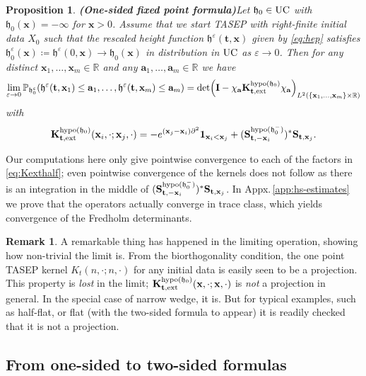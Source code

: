 \documentclass[letterpaper,reqno,11pt,oneside,final]{amsart}
\newtheorem{prop}[thm]{Proposition}
\theoremstyle{definition}
\newtheorem{rem}[thm]{Remark}
\newcommand{\fh}{\mathfrak{h}}
\newcommand{\pp}{\mathbb{P}}
\newcommand{\rr}{\mathbb{R}}
\newcommand{\uno}[1]{\mathbf{1}_{#1}}
\newcommand{\ep}{\varepsilon}
\newcommand{\uptext}[1]{\text{\upshape{#1}}}
\DeclareMathOperator{\hypo}{\uptext{hypo}}
\DeclareMathOperator{\UC}{\uptext{UC}}
\newcommand{\fT}{\mathbf{S}}
\newcommand{\ft}{\mathbf{t}}
\newcommand{\fx}{\mathbf{x}}
\newcommand{\fa}{\mathbf{a}}
\newcommand{\fK}{\mathbf{K}}
\newcommand{\fI}{\mathbf{I}}
\numberwithin{equation}{section}
\begin{document}
\begin{prop}{\bf (One-sided fixed point formula)}\label{prop:Kfixedpthalf}
\enspace Let $\fh_0\in \UC$ with  $\fh_0(\fx) = -\infty$ for $\fx>0$.
Assume that we start TASEP with right-finite initial data $X_0$ such that the rescaled height function $\fh^\ep(\ft,\fx)$ given by \eqref{eq:hep} satisfies $\fh^\ep_0(\fx)\coloneqq\fh^\ep(0,\fx)\longrightarrow\fh_0(\fx)$ in distribution in $\UC$ as $\ep\to0$. 
Then for any distinct $\fx_1,\dotsc,\fx_m\in\rr$ and any $\fa_1,\dotsc,\fa_m\in\rr$ we have
\begin{equation}
\lim_{\ep\to0}\pp_{\fh^\ep_0}\!\left(\fh^\ep(\ft,\fx_1)\leq \fa_1,\dotsc,\fh^\ep(\ft,\fx_m)\leq \fa_m\right)
=\det\!\left(\fI-\chi_{\fa} \fK^{\hypo(\fh_0)}_{\ft,\uptext{ext}}\chi_{\fa}\right)_{L^2(\{\fx_1,\dotsc,\fx_m\}\times\rr)}\label{eq:onesideext}
\end{equation}
with
\begin{equation}\label{eq:Kexthalf}
\fK^{\hypo(\fh_0)}_{\ft,\uptext{ext}}(\fx_i,\cdot;\fx_j,\cdot)=-e^{(\fx_j-\fx_i)\partial^2}\uno{\fx_i<\fx_j}
+(\fT^{\hypo(\fh_0^-)}_{\ft,-\fx_i})^*\fT_{\ft,\fx_j}.
\end{equation} 
\end{prop}

Our computations here only give pointwise convergence to each of the factors in \eqref{eq:Kexthalf}; even pointwise convergence of the kernels does not follow as there is an integration in the middle of $(\fT^{\hypo(\fh_0^-)}_{\ft,-\fx_i})^*\fT_{\ft,\fx_j}$.
In  Appx.\,\ref{app:hs-estimates} we prove that the operators actually converge in trace class, which  yields convergence of the Fredholm determinants.  

\begin{rem}
A remarkable thing has happened in the limiting operation, showing how non-trivial the limit is. From the biorthogonality condition, the one point TASEP kernel $K_t(n,\cdot;n,\cdot)$ for any initial data is easily seen to be a projection. This property is \emph{lost} in the limit; $\fK^{\hypo(\fh_0)}_{\ft,\uptext{ext}}(\fx,\cdot;\fx,\cdot)$ is \emph{not} a projection in general. In the special case of narrow wedge, it is. But for typical examples, such as half-flat, or flat (with the two-sided formula to appear) it is readily checked that it is not a projection.
\end{rem}



\subsection{From one-sided to two-sided formulas}\label{sec:1to2sided}
\end{document}
